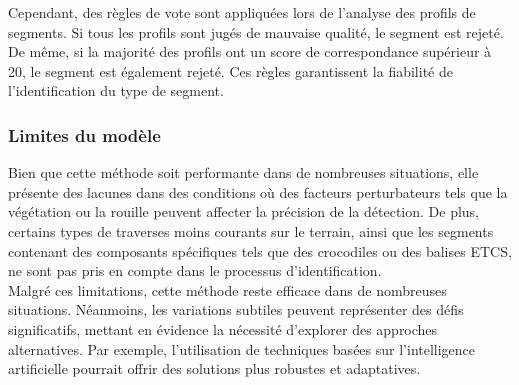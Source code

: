 \noindent Cependant, des règles de vote sont appliquées lors de l'analyse des profils de segments. Si tous les profils sont jugés de mauvaise qualité, le segment est rejeté. De même, si la majorité des profils ont un score de correspondance supérieur à 20, le segment est également rejeté. Ces règles garantissent la fiabilité de l'identification du type de segment.


\subsubsection{Limites du modèle}


Bien que cette méthode soit performante dans de nombreuses situations, elle présente des lacunes dans des conditions où des facteurs perturbateurs tels que la végétation ou la rouille peuvent affecter la précision de la détection. De plus, certains types de traverses moins courants sur le terrain, ainsi que les segments contenant des composants spécifiques tels que des crocodiles ou des balises ETCS, ne sont pas pris en compte dans le processus d'identification. \\

\noindent Malgré ces limitations, cette méthode reste efficace dans de nombreuses situations. Néanmoins, les variations subtiles peuvent représenter des défis significatifs, mettant en évidence la nécessité d'explorer des approches alternatives. Par exemple, l'utilisation de techniques basées sur l'intelligence artificielle pourrait offrir des solutions plus robustes et adaptatives.

